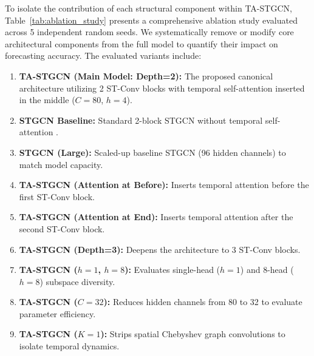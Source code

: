 \documentclass[a4paper,fleqn]{cas-sc}
\begin{document}
To isolate the contribution of each structural component within TA-STGCN, Table~\ref{tab:ablation_study} presents a comprehensive ablation study evaluated across 5 independent random seeds. We systematically remove or modify core architectural components from the full model to quantify their impact on forecasting accuracy. The evaluated variants include:
\begin{enumerate}
    \item \textbf{TA-STGCN (Main Model: Depth=2):} The proposed canonical architecture utilizing 2 ST-Conv blocks with temporal self-attention inserted in the middle ($C=80$, $h=4$).
    \item \textbf{STGCN Baseline:} Standard 2-block STGCN without temporal self-attention \cite{stgcn}.
    \item \textbf{STGCN (Large):} Scaled-up baseline STGCN (96 hidden channels) to match model capacity.
    \item \textbf{TA-STGCN (Attention at Before):} Inserts temporal attention before the first ST-Conv block.
    \item \textbf{TA-STGCN (Attention at End):} Inserts temporal attention after the second ST-Conv block.
    \item \textbf{TA-STGCN (Depth=3):} Deepens the architecture to 3 ST-Conv blocks.
    \item \textbf{TA-STGCN ($h=1$, $h=8$):} Evaluates single-head ($h=1$) and 8-head ($h=8$) subspace diversity.
    \item \textbf{TA-STGCN ($C=32$):} Reduces hidden channels from 80 to 32 to evaluate parameter efficiency.
    \item \textbf{TA-STGCN ($K=1$):} Strips spatial Chebyshev graph convolutions to isolate temporal dynamics.
\end{enumerate}
\end{document}
